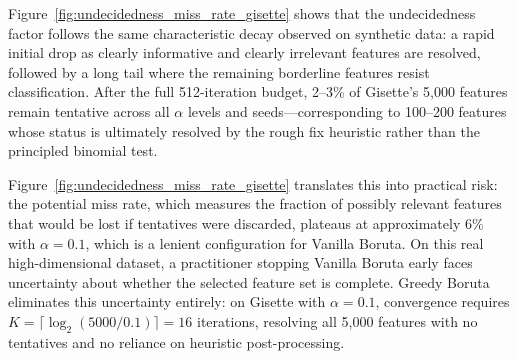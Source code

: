 \documentclass[runningheads]{llncs}
\newcommand{\decision}[1]{\todo[inline,color=red!20]{DECISION: #1}}
\begin{document}

Figure~\ref{fig:undecidedness_miss_rate_gisette} shows that the undecidedness factor
follows the same characteristic decay observed on synthetic data: a rapid
initial drop as clearly informative and clearly irrelevant features are
resolved, followed by a long tail where the remaining borderline features
resist classification.
After the full 512-iteration budget, 2--3\% of Gisette's 5{,}000 features
remain tentative across all $\alpha$ levels and seeds---corresponding to
100--200 features whose status is ultimately resolved by the rough fix
heuristic rather than the principled binomial test.
 
Figure~\ref{fig:undecidedness_miss_rate_gisette} translates this into practical risk:
the potential miss rate, which measures the fraction of possibly relevant
features that would be lost if tentatives were discarded, plateaus at
approximately 6\% with $\alpha = 0.1$, which is a lenient configuration for Vanilla Boruta.
On this real high-dimensional dataset, a practitioner stopping Vanilla Boruta early faces  uncertainty about whether the selected feature set is complete.
Greedy Boruta eliminates this uncertainty entirely: on Gisette with
$\alpha = 0.1$, convergence requires $K = \lceil \log_2(5000/0.1)
\rceil = 16$ iterations, resolving all 5{,}000 features with no tentatives
and no reliance on heuristic post-processing.
 
\end{document}
